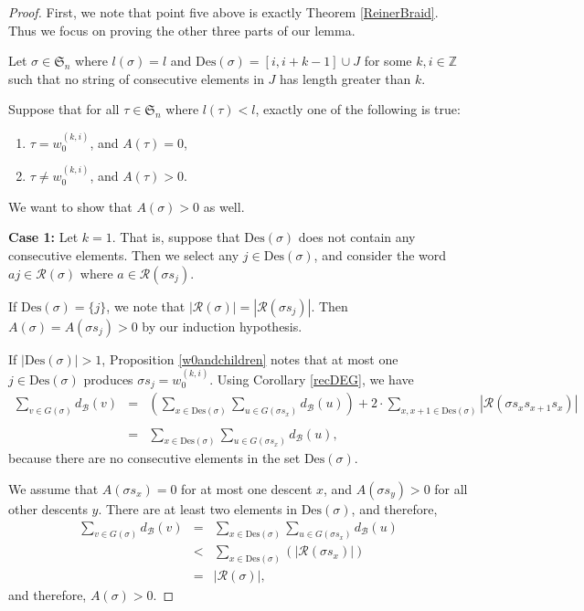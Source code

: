 \documentclass[11pt,reqno]{amsart}
\theoremstyle{definition}
\theoremstyle{notation}
\newcommand{\Des}{\text{Des}}
\newcommand{\calR}{\mathcal{R}}
\newcommand{\calB}{\mathcal{B}}
\begin{document}
\begin{proof}
First, we note that point five above is exactly Theorem \ref{ReinerBraid}. Thus we focus on proving the other three parts of our lemma.

Let $\sigma \in \mathfrak{S}_n$ where $l(\sigma) = l$ and $\Des(\sigma) =   [i,i+k-1] \cup J$ for some $k,i\in \mathbb{Z}$ such that no string of consecutive elements in $J$ has length greater than $k$. 

Suppose that for all $\tau \in \mathfrak{S}_n$ where $l(\tau)<l$, exactly one of the following is true:
\begin{enumerate}
\item $\tau = w_0^{(k,i)}$, and $A(\tau) = 0$,
\item $\tau \neq w_0^{(k,i)}$, and $A(\tau)>0$.
\end{enumerate}
We want to show that $A(\sigma)>0$ as well.

\textbf{Case 1:} Let $k=1$. That is, suppose that $\Des(\sigma)$ does not contain any consecutive elements. Then we select any $j\in \Des(\sigma)$, and consider the word $aj\in \calR(\sigma)$ where $a\in \calR(\sigma s_j)$.

If $\Des(\sigma) = \{j\}$, we note that $|\calR(\sigma)|=|\calR(\sigma s_j)|$. Then $A(\sigma) = A(\sigma s_j)>0$ by our induction hypothesis.

If $|\Des(\sigma)|>1$, Proposition \ref{w0andchildren} notes that at most one $j\in \Des(\sigma)$ produces $\sigma s_j = w_0^{(k,i)}$. Using Corollary \ref{recDEG}, we have
\begin{eqnarray*}
\sum_{v\in G(\sigma)} d_\calB(v) &=& \left ( \sum_{x\in \Des(\sigma)}\sum_{u\in G(\sigma s_x)}d_\calB(u) \right )+ 2 \cdot \sum_{x,x+1\in \Des(\sigma)}|\calR(\sigma s_xs_{x+1}s_x)| \\
&~& \\
&=& \sum_{x\in \Des(\sigma)}\sum_{u\in G(\sigma s_x)}d_\calB(u) ,
\end{eqnarray*}
because there are no consecutive elements in the set $\Des(\sigma)$.

We assume that $A(\sigma s_x)=0$ for at most one descent $x$, and $A(\sigma s_y)>0$ for all other descents $y$. There are at least two elements in $\Des(\sigma)$, and therefore,
\begin{eqnarray*}
\sum_{v\in G(\sigma)} d_\calB(v) &=& \sum_{x\in \Des(\sigma)}\sum_{u\in G(\sigma s_x)}d_\calB(u) \\
&< &  \sum_{x\in \Des(\sigma)}\left ( |\calR(\sigma s_x)|\right )\\
&=& |\calR(\sigma)|,
\end{eqnarray*}
and therefore, $A(\sigma)>0$.


\end{proof}
\end{document}
